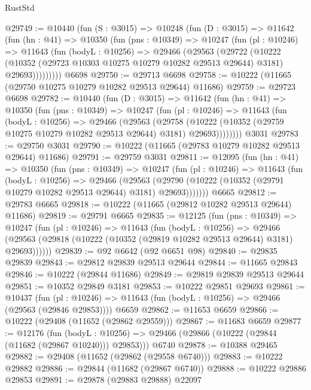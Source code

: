 \begin{lexlean}{RustStd}
\begin{coremodule}
@29749 := @10440
    (fun (S : @3015) =>
    @10248
      (fun (D : @3015) =>
      @11642
        (fun (hn : @41) =>
        @10350
          (fun (pns : @10349) =>
          @10247
            (fun (pl : @10246) =>
            @11643
              (fun (bodyL : @10256) =>
              @29466
                (@29563
                  (@29722
                    (@10222
                      (@10352 (@29723 @10303 @10275 @10279 @10282 @29513 @29644) @3181)
                      @29693)))))))))
    @6698
@29750 := @29713 @6698
@29758 := @10222 (@11665 (@29750 @10275 @10279 @10282 @29513 @29644) @11686)
@29759 := @29723 @6698
@29782 := @10440
    (fun (D : @3015) =>
    @11642
      (fun (hn : @41) =>
      @10350
        (fun (pns : @10349) =>
        @10247
          (fun (pl : @10246) =>
          @11643
            (fun (bodyL : @10256) =>
            @29466
              (@29563
                (@29758
                  (@10222 (@10352 (@29759 @10275 @10279 @10282 @29513 @29644) @3181) @29693))))))))
    @3031
@29783 := @29750 @3031
@29790 := @10222 (@11665 (@29783 @10279 @10282 @29513 @29644) @11686)
@29791 := @29759 @3031
@29811 := @12095
    (fun (hn : @41) =>
    @10350
      (fun (pns : @10349) =>
      @10247
        (fun (pl : @10246) =>
        @11643
          (fun (bodyL : @10256) =>
          @29466
            (@29563
              (@29790 (@10222 (@10352 (@29791 @10279 @10282 @29513 @29644) @3181) @29693)))))))
    @6665
@29812 := @29783 @6665
@29818 := @10222 (@11665 (@29812 @10282 @29513 @29644) @11686)
@29819 := @29791 @6665
@29835 := @12125
    (fun (pns : @10349) =>
    @10247
      (fun (pl : @10246) =>
      @11643
        (fun (bodyL : @10256) =>
        @29466 (@29563 (@29818 (@10222 (@10352 (@29819 @10282 @29513 @29644) @3181) @29693))))))
@29839 := @92 @6642 (@92 @6651 @98)
@29840 := @29835 @29839
@29843 := @29812 @29839 @29513 @29644
@29844 := @11665 @29843
@29846 := @10222 (@29844 @11686)
@29849 := @29819 @29839 @29513 @29644
@29851 := @10352 @29849 @3181
@29853 := @10222 @29851 @29693
@29861 := @10437
    (fun (pl : @10246) => @11643 (fun (bodyL : @10256) => @29466 (@29563 (@29846 @29853))))
    @6659
@29862 := @11653 @6659
@29866 := @10222 (@29408 (@11652 (@29862 @29559)))
@29867 := @11683 @6659
@29877 := @12176
    (fun (bodyL : @10256) => @29466 (@29866 (@10222 (@29844 (@11682 (@29867 @10240))) @29853)))
    @6740
@29878 := @10388 @29465
@29882 := @29408 (@11652 (@29862 (@29558 @6740)))
@29883 := @10222 @29882
@29886 := @29844 (@11682 (@29867 @6740))
@29888 := @10222 @29886 @29853
@29891 := @29878 (@29883 @29888) @22097

\end{coremodule}
\end{lexlean}
